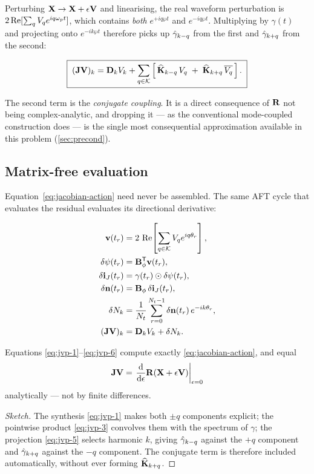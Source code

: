 Perturbing $\mathbf{X}\to\mathbf{X}+\epsilon\mathbf{V}$ and linearising, the real waveform
perturbation is $2\operatorname{Re}[\sum_q V_q e^{iq\omega_{p} t}]$, which contains \emph{both}
$e^{+iq\wp t}$ and $e^{-iq\wp t}$. Multiplying by $\gamma(t)$ and projecting
onto $e^{-ik\wp t}$ therefore picks up $\hat{\gamma}_{k-q}$ from the first and
$\hat{\gamma}_{k+q}$ from the second:

\begin{equation}
  \boxed{\;
  (\mathbf{J}\mathbf{V})_k
  = \mathbf{D}_k V_k
  + \sum_{q\in\mathcal{K}}
    \left[\,\widehat{\mathbf{K}}_{k-q}\,V_q \;+\; \widehat{\mathbf{K}}_{k+q}\,\overline{V_q}\,\right].
  \;}
  \label{eq:jacobian-action}
\end{equation}

The second term is the \emph{conjugate coupling}. It is a direct consequence of
$\mathbf{R}$ not being complex-analytic, and dropping it --- as the conventional
mode-coupled construction does --- is the single most consequential
approximation available in this problem (\cref{sec:precond}).

\subsection{Matrix-free evaluation}

Equation~\eqref{eq:jacobian-action} need never be assembled. The same AFT cycle
that evaluates the residual evaluates its directional derivative:

\begin{align}
  \mathbf{v}(t_r)      &= 2\,\operatorname{Re}\!\left[\sum_{q\in\mathcal{K}} V_q e^{iq\theta_r}\right],
  \label{eq:jvp-1}\\
  \delta\psi(t_r)    &= \mathbf{B}_{\phi}^{\mathsf T}\mathbf{v}(t_r),
  \label{eq:jvp-2}\\
  \delta\mathbf{i}_{J}(t_r)     &= \gamma(t_r)\odot\delta\psi(t_r),
  \label{eq:jvp-3}\\
  \delta\mathbf{n}(t_r)&= \mathbf{B}_{\phi}\,\delta\mathbf{i}_{J}(t_r),
  \label{eq:jvp-4}\\
  \delta N_k         &= \frac{1}{N_t}\sum_{r=0}^{N_t-1}
                        \delta\mathbf{n}(t_r)\,e^{-ik\theta_r},
  \label{eq:jvp-5}\\
  (\mathbf{J}\mathbf{V})_k     &= \mathbf{D}_k V_k + \delta N_k .
  \label{eq:jvp-6}
\end{align}

\begin{proposition}
Equations \eqref{eq:jvp-1}--\eqref{eq:jvp-6} compute exactly
\eqref{eq:jacobian-action}, and equal
\begin{equation}
  \mathbf{J}\mathbf{V} = \left.\frac{\mathrm{d}}{\mathrm{d}\epsilon}
                \mathbf{R}(\mathbf{X} + \epsilon\mathbf{V})\right|_{\epsilon=0}
\end{equation}
analytically --- not by finite differences.
\end{proposition}
\begin{proof}[Sketch]
The synthesis \eqref{eq:jvp-1} makes both $\pm q$ components explicit; the
pointwise product \eqref{eq:jvp-3} convolves them with the spectrum of $\gamma$;
the projection \eqref{eq:jvp-5} selects harmonic $k$, giving $\hat{\gamma}_{k-q}$
against the $+q$ component and $\hat{\gamma}_{k+q}$ against the $-q$ component. The
conjugate term is therefore included automatically, without ever forming
$\widehat{\mathbf{K}}_{k+q}$.
\end{proof}

